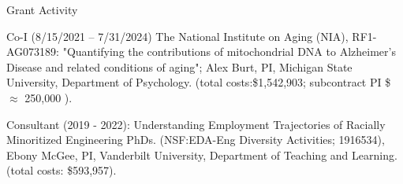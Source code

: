 \begin{rSection}{\textrm{Grant Activity}}%
\begin{etaremune}

\item Co-I (8/15/2021 – 7/31/2024) The National Institute on Aging (NIA), RF1-AG073189: "Quantifying the contributions of mitochondrial DNA to Alzheimer's Disease and related conditions of aging"; Alex Burt, PI, Michigan State University, Department of Psychology.  (total costs:\$1,542,903; subcontract PI \$ $\approx$ 250,000 ).

\item Consultant (2019 - 2022): Understanding Employment Trajectories of Racially Minoritized Engineering PhDs. (NSF:EDA-Eng Diversity Activities; 1916534),
Ebony McGee, PI, Vanderbilt University, Department of Teaching and Learning.  (total costs: \$593,957).
\end{etaremune}\end{rSection}

